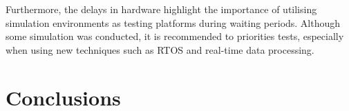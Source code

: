 Furthermore, the delays in hardware highlight the importance of utilising simulation environments as testing platforms during waiting periods. Although some simulation was conducted, it is recommended to priorities tests, especially when using new techniques such as RTOS and real-time data processing.  

\section{Conclusions}
